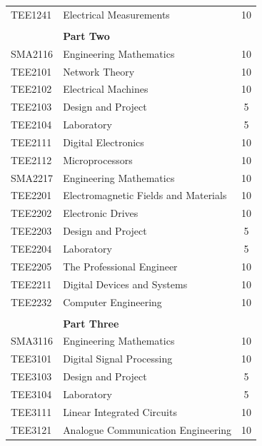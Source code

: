 \begin{tcolorbox}[breakable, width=0.5\textwidth, align=left, enhanced, left= -3pt, boxrule=0pt, colback=white, colframe=white, before=\noindent, top=-13pt, bottom=-8pt]
\begin{longtable}{@{}llS[table-format = 4.3]}
                          TEE1241 & Electrical Measurements & 10 \\
                          & & \\
                          & \textbf{Part Two} & \\
                          SMA2116 & Engineering Mathematics  & 10 \\
                          TEE2101 & Network Theory & 10 \\
                          TEE2102 & Electrical Machines & 10 \\
                          TEE2103 & Design and Project & 5 \\
                          TEE2104 & Laboratory & 5 \\
                          TEE2111 & Digital Electronics & 10 \\
                          TEE2112 & Microprocessors & 10 \\
                          SMA2217 & Engineering Mathematics  & 10 \\
                          TEE2201 & Electromagnetic Fields and Materials & 10 \\
                          TEE2202 & Electronic Drives & 10 \\
                          TEE2203 & Design and Project & 5 \\
                          TEE2204 & Laboratory & 5 \\
                          TEE2205 & The Professional Engineer  & 10 \\
                          TEE2211 & Digital Devices and Systems & 10 \\
                          TEE2232 & Computer Engineering  & 10 \\
                          & & \\
                          & \textbf{Part Three} & \\
                          SMA3116 & Engineering Mathematics  & 10 \\
                          TEE3101 & Digital Signal Processing & 10 \\
                          TEE3103 & Design and Project & 5 \\
                          TEE3104 & Laboratory & 5 \\
                          TEE3111 & Linear Integrated Circuits & 10 \\
                          TEE3121 & Analogue Communication Engineering & 10 \\

\end{longtable}
\end{tcolorbox}
